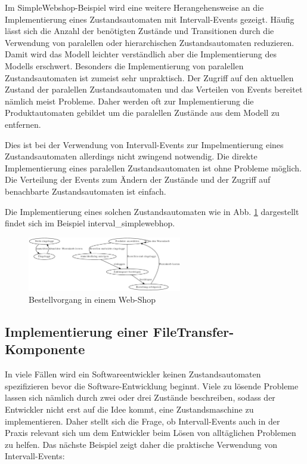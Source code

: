 Im SimpleWebshop-Beispiel wird eine weitere Herangehensweise an die
Implementierung eines Zustandsautomaten mit Intervall-Events gezeigt. Häufig
lässt sich die Anzahl der benötigten Zustände und Transitionen durch die
Verwendung von paralellen oder hierarchischen Zustandsautomaten reduzieren.
Damit wird das Modell leichter verständlich aber die Implementierung des Modells
erschwert. 
Besonders die Implementierung von paralellen Zustandsautomaten ist zumeist sehr
unpraktisch. Der Zugriff auf den aktuellen Zustand der paralellen
Zustandsautomaten und das Verteilen von Events bereitet nämlich meist
Probleme. Daher werden oft zur Implementierung die Produktautomaten gebildet um
die paralellen Zustände aus dem Modell zu entfernen.

Dies ist bei der Verwendung von Intervall-Events zur Impelmentierung eines
Zustandsautomaten allerdings nicht zwingend notwendig. Die direkte
Implementierung eines paralellen Zustandsautomaten ist ohne Probleme möglich.
Die Verteilung der Events zum Ändern der Zustände und der Zugriff auf
benachbarte Zustandsautomaten ist einfach. 

Die Implementierung eines solchen Zustandsautomaten wie in Abb.
\ref{webshop_behaviour} dargestellt findet sich im Beispiel
interval\_simplewebhop.

\begin{figure}[htp]
\begin{center}
  \includegraphics[width=0.6\textwidth]{graphics/webshop.dot.eps}
  \caption{Bestellvorgang in einem Web-Shop}
  \label{webshop_behaviour}
\end{center}
\end{figure}

\subsection{Implementierung einer FileTransfer-Komponente}
In viele Fällen wird ein Softwareentwickler keinen Zustandsautomaten
spezifizieren bevor die Software-Entwicklung beginnt. Viele zu lösende Probleme
lassen sich nämlich durch zwei oder drei Zustände beschreiben, sodass der
Entwickler nicht erst auf die Idee kommt, eine Zustandsmaschine zu
implementieren. Daher stellt sich die Frage, ob Intervall-Events auch in der
Praxis relevant sich um dem Entwickler beim Lösen von alltäglichen Problemen zu
helfen. Das nächste Beispiel zeigt daher die praktische Verwendung von
Intervall-Events:

